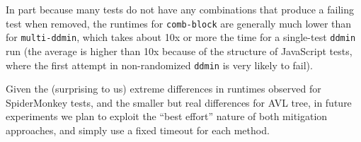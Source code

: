 In part because many tests do not have any combinations that produce a failing
test when removed, the runtimes for {\tt comb-block} are
generally much lower than for {\tt multi-ddmin}, which takes about 10x
or more the time for a single-test {\tt ddmin} run (the average is
higher than 10x because of the structure of JavaScript tests, where
the first attempt in non-randomized {\tt ddmin} is very likely to
fail).

Given the (surprising to us) extreme differences in runtimes observed
for SpiderMonkey tests, and the smaller but real differences for AVL tree,
in future experiments we plan to exploit the ``best effort'' nature of
both mitigation approaches, and simply use a fixed timeout for each method.